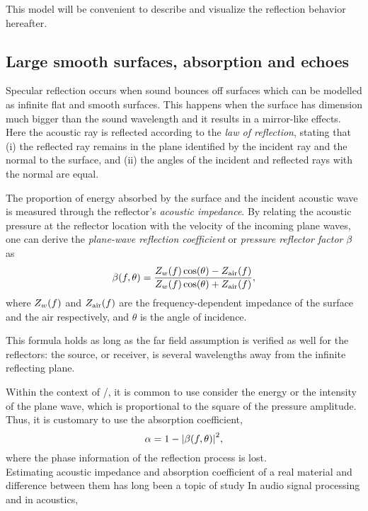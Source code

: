 This model will be convenient to describe and visualize the reflection behavior hereafter.

\subsection{Large smooth surfaces, absorption and echoes}
Specular reflection occurs when sound bounces off surfaces which can be modelled as infinite flat and smooth surfaces.
This happens when the surface has dimension much bigger than the sound wavelength and it results in a mirror-like effects.
Here the acoustic ray is reflected according to the \textit{law of reflection}, stating that
(i) the reflected ray remains in the plane identified by the incident ray and the normal to the surface,
and (ii) the angles of the incident and reflected rays with the normal are equal.

The proportion of energy absorbed by the surface and the incident acoustic wave is measured
through the reflector's \textit{acoustic impedance}.
By relating the acoustic pressure at the reflector location with the velocity of the incoming plane waves,
one can derive the \textit{plane-wave reflection coefficient} or \textit{pressure reflector factor} $\beta$ \cite{kuttruff} as
\begin{equation}
    \beta(f, \theta) = \frac{Z_w(f)\cos(\theta) - Z_\text{air}(f)}{Z_w(f)\cos(\theta) + Z_\text{air}(f)}
    ,
\end{equation}
where $Z_w(f)$ and $Z_\text{air}(f)$ are the frequency-dependent impedance of the surface and the air respectively,
and $\theta$ is the angle of incidence.

This formula holds as long as the far field assumption is verified as well for the reflectors:
the source, or receiver, is several wavelengths away from the infinite reflecting plane.

Within the context of \GA/, it is common to use consider the energy or the intensity of the plane wave, which is
proportional to the square of the pressure amplitude. Thus, it is customary to use the absorption coefficient,
\begin{equation}
    \absCoeff = 1 - \abs{\reflCoeff(f, \theta)}^2
    ,
\end{equation}
where the phase information of the reflection process is lost.
\\Estimating acoustic impedance and absorption coefficient of a real material and difference between them has long been a topic of study
In audio signal processing and in acoustics,

